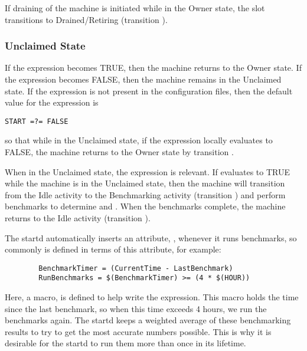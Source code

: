 If draining of the machine is initiated while in the Owner state, the
slot transitions to Drained/Retiring (transition ).

\subsubsection{\label{sec:Unclaimed-State}Unclaimed State}

If the  expression becomes TRUE, then the machine returns
to the Owner state.
If the  expression becomes FALSE, then the machine remains
in the Unclaimed state.
If the  expression is not present in the configuration files,
then the default value for the  expression is 
\begin{verbatim}
START =?= FALSE
\end{verbatim}
so that
while in the Unclaimed state, if the  expression locally
evaluates to FALSE, the machine returns to the Owner state by
transition .

When in the Unclaimed state,
the 
expression is relevant.
If  evaluates to TRUE while the machine
is in the Unclaimed state,
then the machine will transition from the Idle
activity to the Benchmarking activity (transition ) and
perform benchmarks to determine  and .  
When the benchmarks complete, the machine returns to the Idle activity
(transition ).

The startd automatically inserts an attribute, ,
whenever it runs benchmarks, so commonly  is
defined in terms of this attribute, for example:
\begin{verbatim}
        BenchmarkTimer = (CurrentTime - LastBenchmark)
        RunBenchmarks = $(BenchmarkTimer) >= (4 * $(HOUR))
\end{verbatim}
Here, a macro,  is defined to help write the
expression.
This macro holds the time since the last benchmark,
so when this time exceeds 4 hours, we run the benchmarks again.
The startd keeps a weighted average of these benchmarking
results to try to get the most accurate numbers possible.
This is why
it is desirable for 
the startd to run them more than once in its lifetime.

